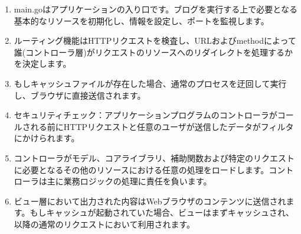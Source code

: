 \begin{enumerate}
  \item main.goはアプリケーションの入り口です。ブログを実行する上で必要となる基本的なリソースを初期化し、情報を設定し、ポートを監視します。
  \item ルーティング機能はHTTPリクエストを検査し、URLおよびmethodによって誰(コントローラ層)がリクエストのリソースへのリダイレクトを処理するかを決定します。
  \item もしキャッシュファイルが存在した場合、通常のプロセスを迂回して実行し、ブラウザに直接送信されます。
  \item セキュリティチェック：アプリケーションプログラムのコントローラがコールされる前にHTTPリクエストと任意のユーザが送信したデータがフィルタにかけられます。
  \item コントローラがモデル、コアライブラリ、補助関数および特定のリクエストに必要となるその他のリソースにおける任意の処理をロードします。コントローラは主に業務ロジックの処理に責任を負います。
  \item ビュー層において出力された内容はWebブラウザのコンテンツに送信されます。もしキャッシュが起動されていた場合、ビューはまずキャッシュされ、以降の通常のリクエストにおいて利用されます。
\end{enumerate}
